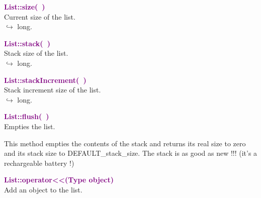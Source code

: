 \textcolor{purple}{\textbf{List::size(~)}}\label{List::size()}\\
Current size of the list.\\ \hspace*{10mm}$\hookrightarrow$ long.


\textcolor{purple}{\textbf{List::stack(~)}}\label{List::stack()}\\
Stack size of the list.\\ \hspace*{10mm}$\hookrightarrow$ long.


\textcolor{purple}{\textbf{List::stackIncrement(~)}}\label{List::stackIncrement()}\\
Stack increment size of the list.\\ \hspace*{10mm}$\hookrightarrow$ long.


\textcolor{purple}{\textbf{List::flush(~)}}\label{List::flush()}\\
Empties the list.

This method empties the contents of the stack and returns its real size to zero and its stack size to DEFAULT\_stack\_size.
The stack is as good as new !!! (it's a rechargeable battery !)

\textcolor{purple}{\textbf{List::operator<<(Type object)}}\label{List::operator<<(Type object)}\\
Add an object to the list.

